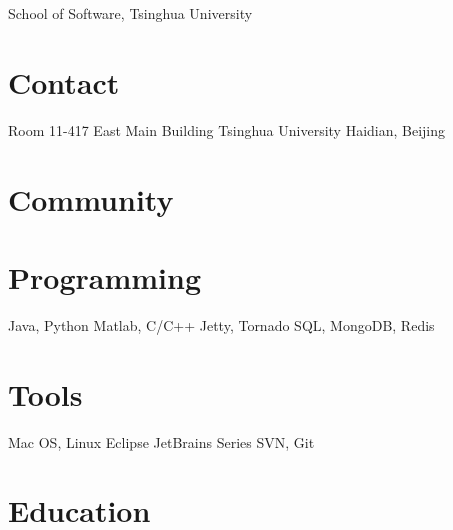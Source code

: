 \documentclass[]{friggeri-cv}
\begin{document}
       {School of Software, Tsinghua University}

\begin{aside}
  \section{Contact}
    Room 11-417
    East Main Building
    Tsinghua University
    Haidian, Beijing
  \section{Community}
  \section{Programming}
    Java, Python
    Matlab, C/C++
    Jetty, Tornado
    SQL, MongoDB, Redis
  \section{Tools}
    Mac OS, Linux
    Eclipse
    JetBrains Series
    SVN, Git
\end{aside}



\section{Education}
\end{document}
